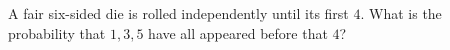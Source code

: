 A fair six-sided die is rolled independently until its first $4$. What is the probability that $1,3,5$ have all appeared before that $4$?
